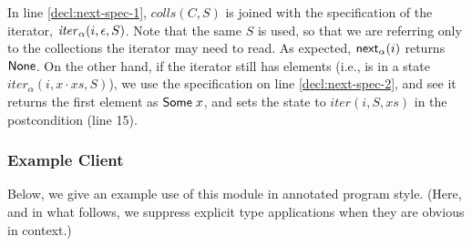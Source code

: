 In line \ref{decl:next-spec-1}, $\mathit{colls}(C, S)$ is joined with 
the specification of the iterator, $\mathit{iter}_\alpha(i, \epsilon, S)$. Note
that the same $S$ is used, so that we are referring only to the collections
the iterator may need to read.  As expected, $\mathsf{next}_\alpha(i)$ returns 
$\mathsf{None}$.  On the other hand, if the iterator still has elements (i.e., is in a state
$iter_\alpha(i, x\cdot xs, S)$), we use the specification on line \ref{decl:next-spec-2}, 
and see it returns the first element as
$\mathsf{Some}\;x$, and sets the state to $iter(i, S, xs)$ in the
postcondition (line 15). 

\subsubsection{Example Client}

Below, we give an example use of this module in annotated program
style. (Here, and in what follows, we suppress explicit type
applications when they are obvious in context.)

